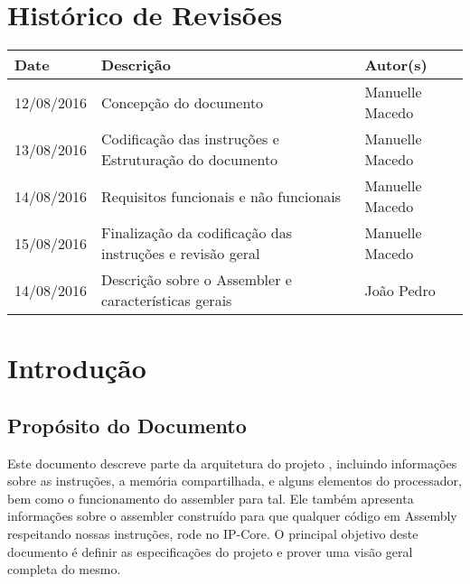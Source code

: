 \documentclass{report}
\begin{document}

\capa
\newpage
\newpage

\chapter*{Histórico de Revisões}
  \vspace*{1cm}
  \begin{table}[ht]
    \centering
    \begin{tabular}[pos]{|m{2cm} | m{8cm} | m{4cm}|} 
      \hline
      \cellcolor[gray]{0.9}
      \textbf{Date} & \cellcolor[gray]{0.9}\textbf{Descrição} & \cellcolor[gray]{0.9}\textbf{Autor(s)}\\
      \hline
      12/08/2016 &  Concepção do documento & Manuelle Macedo \\ \hline    
      13/08/2016 &  Codificação das instruções e Estruturação do documento & Manuelle Macedo \\ \hline
      14/08/2016 &  Requisitos funcionais e não funcionais & Manuelle Macedo \\ \hline
      15/08/2016 &  Finalização da codificação das instruções e revisão geral & Manuelle Macedo \\ \hline
      14/08/2016 &  Descrição sobre o Assembler e características gerais & João Pedro \\ \hline
    \end{tabular}
  \end{table}

\tableofcontents

\chapter{Introdução}
  
  \section{Propósito do Documento}
  Este documento descreve parte da arquitetura do projeto \ipPROCESSProject, incluindo informações sobre as instruções, a memória compartilhada, e alguns elementos do processador, bem como o funcionamento do assembler para tal. Ele também apresenta informações sobre o assembler construído para que qualquer código em Assembly respeitando nossas instruções, rode no IP-Core. O principal objetivo deste documento é definir as especificações do projeto \ipPROCESSProject e prover uma visão geral completa do mesmo.
  
\end{document}
